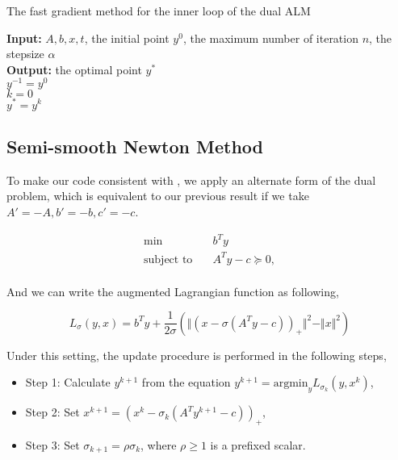 \documentclass[a4paper]{article}
\begin{document}
\begin{algorithm}[H]
	\caption{The fast gradient method for the inner loop of the dual ALM}
	\SetAlgoLined
	\textbf{Input:} $A, b, x, t$, the initial point $y^0$, the maximum number of iteration $n$, the stepsize $\alpha$\\
	\textbf{Output:} the optimal point $y^*$\\
	$y^{-1} = y^0$\\
	$k=0$\\
	$y^* = y^k$
\end{algorithm}

\subsection{Semi-smooth Newton Method}
To make our code consistent with \cite{zhao}, we apply an alternate form of the dual problem, which is equivalent to our previous result if we take $A' = -A, b' = -b, c' = -c$. 

\begin{equation}\label{dual}
\begin{split}
\min \quad  & b^Ty\\
\textrm{subject to} \quad & A^Ty-c \succeq 0, \\
\end{split}
\end{equation}

And we can write the augmented Lagrangian function as following, 

\begin{displaymath}
L_\sigma(y, x) = b^Ty + \frac{1}{2\sigma}(\Vert(x - \sigma(A^Ty - c))_+\Vert^2 - \Vert x\Vert^2)
\end{displaymath}

Under this setting, the update procedure is performed in the following steps, 

\begin{itemize}
	\item Step 1: Calculate $y^{k+1}$ from the equation $y^{k+1}=\textrm{argmin}_yL_{\sigma_k}(y, x^k)$, 
	\item Step 2: Set $x^{k+1} = (x^{k} - \sigma_k (A^Ty^{k+1}-c))_+$, 
	\item Step 3: Set $\sigma_{k+1} = \rho \sigma_k$, where $\rho \geq 1$ is a prefixed scalar.
\end{itemize}
\end{document}
